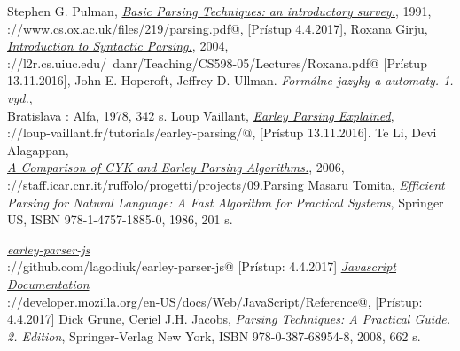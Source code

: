 \documentclass[12pt,a4paper]{report}
\theoremstyle{definition}
\theoremstyle{remark}
\begin{document}
\renewcommand\bibname{Literatúra}
\begin{thebibliography}{99}
Stephen G. Pulman, \emph{\href{https://www.cs.ox.ac.uk/files/219/parsing.pdf}{Basic Parsing Techniques: an introductory survey.}}, 1991, \\ \verb@https://www.cs.ox.ac.uk/files/219/parsing.pdf@, [Prístup 4.4.2017],
Roxana Girju, \emph{\href{http://l2r.cs.uiuc.edu/~danr/Teaching/CS598-05/Lectures/Roxana.pdf}{Introduction to Syntactic Parsing.}}, 2004, \\ \verb@http://l2r.cs.uiuc.edu/~danr/Teaching/CS598-05/Lectures/Roxana.pdf@ [Prístup 13.11.2016],
John E. Hopcroft, Jeffrey D. Ullman. \emph{Formálne jazyky a automaty. 1. vyd.}, \\ Bratislava : Alfa, 1978, 342 s.
Loup Vaillant, \emph{\href{http://loup-vaillant.fr/tutorials/earley-parsing/}{Earley Parsing Explained}}, \\ \verb@http://loup-vaillant.fr/tutorials/earley-parsing/@, [Prístup 13.11.2016].
Te Li, Devi Alagappan, \\
\emph{\href{http://staff.icar.cnr.it/ruffolo/progetti/projects/09.Parsing\%20CYK/A\%20Comparison\%20of\%20CYK\%20and\%20Earley\%20Parsing\%20Algorithms-cykeReport.pdf}{A Comparison of CYK and Earley Parsing Algorithms.}}, 2006, \\ \verb@http://staff.icar.cnr.it/ruffolo/progetti/projects/09.Parsing\@
\verb@%20CYK/A\%20Comparison\%20of\%20CYK\%20and\%20Earley\%20Parsing\@
\verb@%20Algorithms-cykeReport.pdf@ [Prístup 18.11.2016],
Masaru Tomita, \emph{Efficient Parsing for Natural Language: A Fast Algorithm for Practical Systems}, Springer US, ISBN 978-1-4757-1885-0, 1986, 201 s.

\emph{\href{https://github.com/lagodiuk/earley-parser-js}{earley-parser-js}}  \\
\verb@https://github.com/lagodiuk/earley-parser-js@ [Prístup: 4.4.2017]
\emph{\href{https://developer.mozilla.org/en-US/docs/Web/JavaScript/Reference}{Javascript Documentation}} \\ \verb@https://developer.mozilla.org/en-US/docs/Web/JavaScript/Reference@, [Prístup: 4.4.2017]
Dick Grune, Ceriel J.H. Jacobs, \emph{Parsing Techniques: A Practical Guide. 2. Edition}, Springer-Verlag New York,  ISBN 978-0-387-68954-8, 2008, 662 s.
\end{thebibliography}
\end{document}
